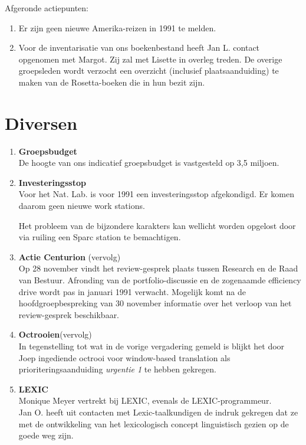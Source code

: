 Afgeronde actiepunten:
\begin{enumerate}

  \item Er zijn geen nieuwe Amerika-reizen in 1991 te melden.
  \item Voor de inventarisatie van ons boekenbestand heeft Jan L. 
        contact opgenomen met Margot. Zij zal met Lisette in overleg treden. De 
overige groepsleden wordt verzocht een overzicht (inclusief plaatsaanduiding) 
te maken van de Rosetta-boeken die in hun bezit zijn. 
\end{enumerate}


\section{Diversen}
\begin{enumerate}
\item {\bf Groepsbudget}\\
De hoogte van ons indicatief groepsbudget is vastgesteld op 3,5 
miljoen.
\item {\bf Investeringsstop}\\
Voor het Nat. Lab. is voor 1991 een investeringsstop afgekondigd.
Er komen daarom geen nieuwe work stations. 

Het probleem van de bijzondere 
karakters kan wellicht worden opgelost door via ruiling een Sparc 
station te bemachtigen.
\item {\bf Actie Centurion} (vervolg)\\
Op 28 november vindt
het review-gesprek plaats tussen Research en de Raad van Bestuur.
Afronding van de portfolio-discussie en de zogenaamde efficiency drive
wordt pas in januari 1991 verwacht. 
Mogelijk komt na de hoofdgroepbespreking van 30 november 
informatie over het verloop van het review-gesprek beschikbaar.

\item {\bf Octrooien}(vervolg)\\
In tegenstelling tot wat in de vorige vergadering gemeld is blijkt 
het door Joep ingediende octrooi voor window-based translation 
als prioriteringsaanduiding {\em urgentie 1} te hebben gekregen. 


\item {\bf LEXIC}\\
Monique Meyer vertrekt bij LEXIC, evenals de LEXIC-programmeur.\\
Jan O. heeft uit contacten met Lexic-taalkundigen de indruk gekregen dat ze 
met de ontwikkeling van het lexicologisch concept linguistisch gezien op de goede 
weg zijn. 


\end{enumerate}
